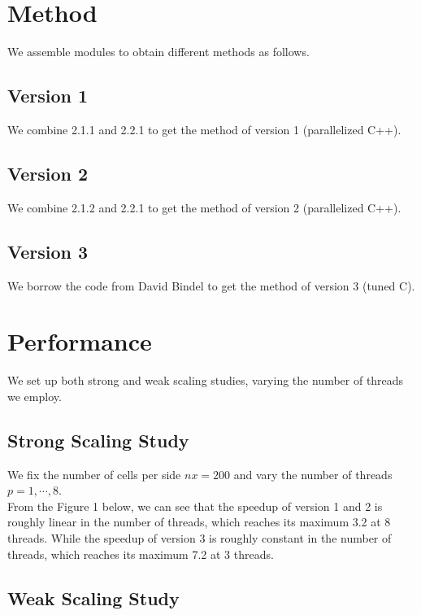 \documentclass[12pt]{article}
\numberwithin{equation}{section}
\begin{document}
\section{Method}

We assemble modules to obtain different methods as follows.

\subsection{Version 1}

We combine 2.1.1 and 2.2.1 to get the method of version 1 (parallelized C++).

\subsection{Version 2}

We combine 2.1.2 and 2.2.1 to get the method of version 2 (parallelized C++).

\subsection{Version 3}

We borrow the code from David Bindel to get the method of version 3 (tuned C).





\section{Performance}

We set up both strong and weak scaling studies, varying the number of threads we employ.

\subsection{Strong Scaling Study}

We fix the number of cells per side $nx = 200$ and vary the number of threads $p = 1, \cdots, 8$.
\\
From the Figure 1 below, we can see that the speedup of version 1 and 2 is roughly linear in the number of threads, which reaches its maximum 3.2 at 8 threads. While the speedup of version 3 is roughly constant in the number of threads, which reaches its maximum 7.2 at 3 threads.


\subsection{Weak Scaling Study}
\end{document}
